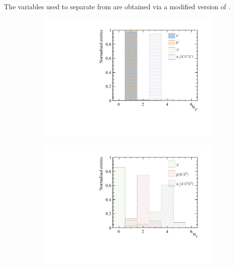 The variables used to separate \Pem from \Pgpm  are obtained via a modified version of \pandora.






\begin{figure}[htbp]
\centering
\begin{subfigure}[b]{0.45\textwidth}
 \includegraphics[width=\textwidth]{tau/var2/nCharge_100GeV_improved.pdf}
  \caption{}
  \label{fig:tauVarNCharge}
\end{subfigure}
\begin{subfigure}[b]{0.45\textwidth}
 \includegraphics[width=\textwidth]{tau/var2/nPhoton_100GeV_improved.pdf}

\end{subfigure}
\end{figure}
